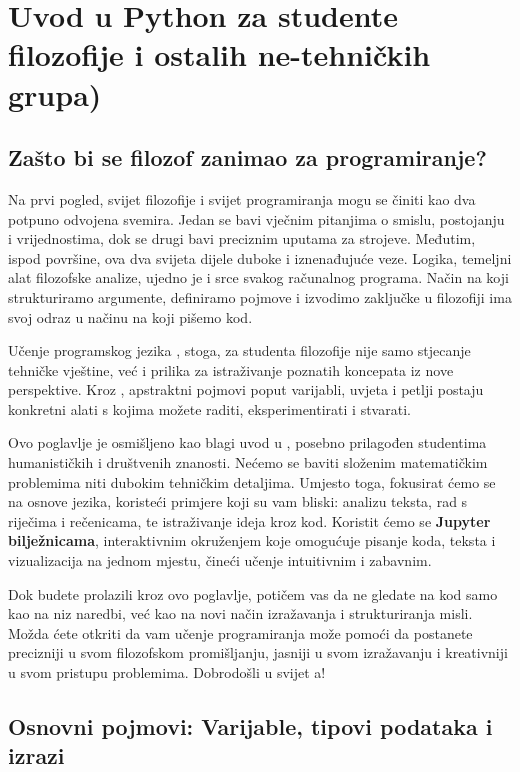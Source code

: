 
\chapter{Uvod u Python za studente filozofije i ostalih ne-tehničkih grupa)}
\label{chap:Uvod u Pzthon}

\section{Zašto bi se filozof zanimao za programiranje?}

Na prvi pogled, svijet filozofije i svijet programiranja mogu se činiti kao dva potpuno odvojena svemira. Jedan se bavi vječnim pitanjima o smislu, postojanju i vrijednostima, dok se drugi bavi preciznim uputama za strojeve. Međutim, ispod površine, ova dva svijeta dijele duboke i iznenađujuće veze. Logika, temeljni alat filozofske analize, ujedno je i srce svakog računalnog programa. Način na koji strukturiramo argumente, definiramo pojmove i izvodimo zaključke u filozofiji ima svoj odraz u načinu na koji pišemo kod.

Učenje programskog jezika , stoga, za studenta filozofije nije samo stjecanje tehničke vještine, već i prilika za istraživanje poznatih koncepata iz nove perspektive. Kroz , apstraktni pojmovi poput varijabli, uvjeta i petlji postaju konkretni alati s kojima možete raditi, eksperimentirati i stvarati.

Ovo poglavlje je osmišljeno kao blagi uvod u , posebno prilagođen studentima humanističkih i društvenih znanosti. Nećemo se baviti složenim matematičkim problemima niti dubokim tehničkim detaljima. Umjesto toga, fokusirat ćemo se na osnove jezika, koristeći primjere koji su vam bliski: analizu teksta, rad s riječima i rečenicama, te istraživanje ideja kroz kod. Koristit ćemo se \textbf{Jupyter bilježnicama}, interaktivnim okruženjem koje omogućuje pisanje koda, teksta i vizualizacija na jednom mjestu, čineći učenje intuitivnim i zabavnim.

Dok budete prolazili kroz ovo poglavlje, potičem vas da ne gledate na kod samo kao na niz naredbi, već kao na novi način izražavanja i strukturiranja misli. Možda ćete otkriti da vam učenje programiranja može pomoći da postanete precizniji u svom filozofskom promišljanju, jasniji u svom izražavanju i kreativniji u svom pristupu problemima. Dobrodošli u svijet a!

\section{Osnovni pojmovi: Varijable, tipovi podataka i izrazi}
\label{sec:osnovni_pojmovi}

